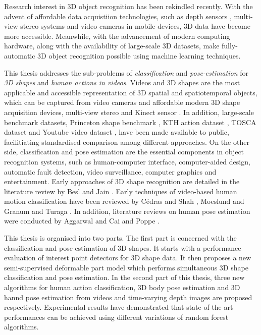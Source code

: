 Research interest in 3D object recognition has been rekindled recently. 
With the advent of affordable data acquistiion technologies, such as depth sensors \cite{Shotton2011}, multi-view stereo systems \cite{Vogiatzis2011} and video cameras in mobile devices, 3D data have become more accessible. Meanwhile, with the advancement of modern computing hardware, along with the availability of large-scale 3D datasets, make fully-automatic 3D object recognition possible using machine learning techniques.  

This thesis addresses the sub-problems of \emph{classification} and \emph{pose-estimation} for \emph{3D shapes} and \emph{human actions in videos}. 
Videos and 3D shapes are the most applicable and accessible representation of 3D spatial and spatiotemporal objects, which can be captured from video cameras and affordable modern 3D shape acquisition devices, \eg multi-view stereo \cite{Vogiatzis2011} and Kinect sensor \cite{Shotton2011}. 
In addition, large-scale benchmark datasets, \eg Princeton shape benchmark \cite{Shilane2004},  KTH action dataset \cite{Schuldt2004}, TOSCA dataset \cite{Bronstein2011} and Youtube video dataset \cite{Liu2009}, have been made available to public, facilitiating standardised comparison among different approaches. 
On the other side, classification and pose estimation are the essential components in object recognition systems, such as human-computer interface, computer-aided design, automatic fault detection, video surveillance, computer graphics and entertainment. 
Early approaches of 3D shape recognition are detailed in the literature review by Besl and Jain \cite{Besl1985}. Early techniques of video-based human motion classification have been reviewed by C\'edras and Shah \cite{Cedras1995}, Moeslund and Granum \cite{Moeslund2001} and Turaga \etal \cite{Turaga2008}. In addition, literature reviews on human pose estimation were conducted by Aggarwal and Cai \cite{Aggarwal1999} and Poppe \cite{Poppe2007}.  

This thesis is organised into two parts.  
The first part is concerned with the classification and pose estimation of 3D shapes. It starts with a performance evaluation of interest point detectors for 3D shape data. It then proposes a new semi-supervised deformable part model which performs simultaneous 3D shape classification and pose estimation. In the second part of this thesis, three new algorithms for human action classification, 3D body pose estimation and 3D hannd pose estimation from videos and time-varying depth images are proposed respectively. Experimental results have demonstrated that state-of-the-art performances can be achieved using different variations of random forest algorithms.    

